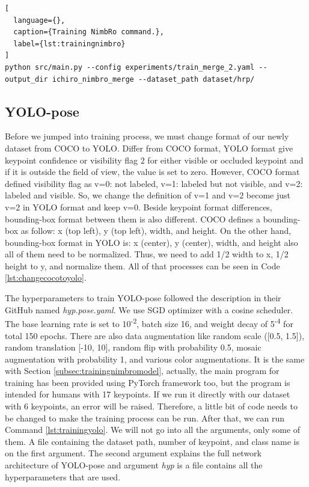 \begin{lstlisting}[
  language={},
  caption={Training NimbRo command.},
  label={lst:trainingnimbro}
]
python src/main.py --config experiments/train_merge_2.yaml --output_dir ichiro_nimbro_merge --dataset_path dataset/hrp/
\end{lstlisting}



\subsection{YOLO-pose}
\label{subsec:trainingyolopose}

Before we jumped into training process, we must change format of our newly dataset from COCO to YOLO. Differ from COCO format, YOLO format give keypoint confidence or visibility flag 2 for either visible or occluded keypoint
and if it is outside the field of view, the value is set to zero. However, COCO format defined visibility flag as v=0: not labeled,  v=1: labeled but not visible, and v=2: labeled and visible. So, we change the definition of
v=1 and v=2 become just v=2 in YOLO format and keep v=0.
Beside keypoint format differences, bounding-box format between them is also different. COCO defines a bounding-box as follow: x (top left), y (top left), width, and height. On the other hand,
bounding-box format in YOLO is: x (center), y (center), width, and height also all of them need to be normalized. Thus, we need to add 1/2 width to x, 1/2 height to y, and normalize them.
All of that processes can be seen in Code \ref{lst:changecocotoyolo}. 



The hyperparameters to train YOLO-pose followed the description in their GitHub named \emph{hyp.pose.yaml}.
We use SGD optimizer with a cosine scheduler. The base learning rate is set to 10\textsuperscript{-2}, batch size 16,
and weight decay of 5\textsuperscript{-4} for total 150 epochs. There are also data augmentation like random scale ([0.5, 1.5]),
random translation [-10, 10], random flip with probability 0.5, mosaic augmentation with probability 1, and various color augmentations.
It is the same with Section \ref{subsec:trainingnimbromodel}, actually, the main program for training has been provided using PyTorch framework too, but the program is intended for humans with 17 keypoints.
If we run it directly with our dataset with 6 keypoints, an error will be raised. Therefore, a little bit of code needs to be changed to make the training process can be run.
After that, we can run Command \ref{lst:trainingyolo}. We will not go into all the arguments, only some of them. 
A file containing the dataset path, number of keypoint, and class name is on the first argument. The second argument explains the full network architecture of YOLO-pose and 
argument \emph{hyp} is a file contains all the hyperparameters that are used.

